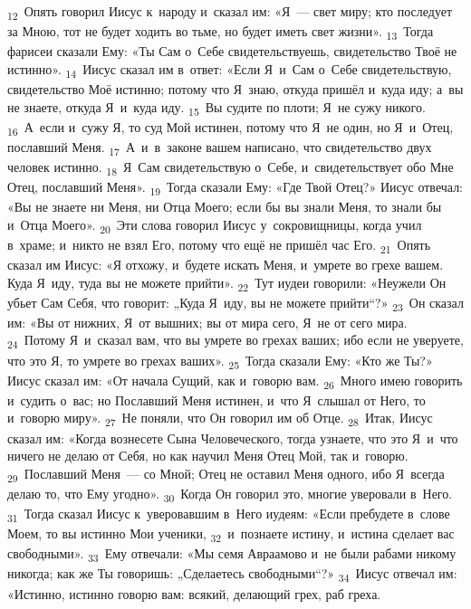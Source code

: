 \documentclass[a4paper,12pt]{article}
\begin{document}
\textsubscript{12}~Опять говорил Иисус к~народу и~сказал им: «Я~--- свет миру; кто последует за Мною, тот не будет ходить во тьме, но будет иметь свет жизни».
\textsubscript{13}~Тогда фарисеи сказали Ему: «Ты Сам о~Себе свидетельствуешь, свидетельство Твоё не истинно».
\textsubscript{14}~Иисус сказал им в~ответ: «Если Я~и~Сам о~Себе свидетельствую, свидетельство Моё истинно; потому что Я~знаю, откуда пришёл и~куда иду; а~вы не знаете, откуда Я~и~куда иду.
\textsubscript{15}~Вы судите по плоти; Я~не сужу никого.
\textsubscript{16}~А~если и~сужу Я, то суд Мой истинен, потому что Я~не один, но Я~и~Отец, пославший Меня.
\textsubscript{17}~А~и~в~законе вашем написано, что свидетельство двух человек истинно.
\textsubscript{18}~Я~Сам свидетельствую о~Себе, и~свидетельствует обо Мне Отец, пославший Меня».
\textsubscript{19}~Тогда сказали Ему: «Где Твой Отец?» Иисус отвечал: «Вы не знаете ни Меня, ни Отца Моего; если бы вы знали Меня, то знали бы и~Отца Моего».
\textsubscript{20}~Эти слова говорил Иисус у~сокровищницы, когда учил в~храме; и~никто не взял Его, потому что ещё не пришёл час Его.
\textsubscript{21}~Опять сказал им Иисус: «Я отхожу, и~будете искать Меня, и~умрете во грехе вашем. Куда Я~иду, туда вы не можете прийти».
\textsubscript{22}~Тут иудеи говорили: «Неужели Он убьет Сам Себя, что говорит: „Куда Я~иду, вы не можете прийти“?»
\textsubscript{23}~Он сказал им: «Вы от нижних, Я~от вышних; вы от мира сего, Я~не от сего мира.
\textsubscript{24}~Потому Я~и~сказал вам, что вы умрете во грехах ваших; ибо если не уверуете, что это Я, то умрете во грехах ваших».
\textsubscript{25}~Тогда сказали Ему: «Кто же Ты?» Иисус сказал им: «От начала Сущий, как и~говорю вам.
\textsubscript{26}~Много имею говорить и~судить о~вас; но Пославший Меня истинен, и~что Я~слышал от Него, то и~говорю миру».
\textsubscript{27}~Не поняли, что Он говорил им об Отце.
\textsubscript{28}~Итак, Иисус сказал им: «Когда вознесете Сына Человеческого, тогда узнаете, что это Я~и~что ничего не делаю от Себя, но как научил Меня Отец Мой, так и~говорю.
\textsubscript{29}~Пославший Меня~--- со Мной; Отец не оставил Меня одного, ибо Я~всегда делаю то, что Ему угодно».
\textsubscript{30}~Когда Он говорил это, многие уверовали в~Него.
\textsubscript{31}~Тогда сказал Иисус к~уверовавшим в~Него иудеям: «Если пребудете в~слове Моем, то вы истинно Мои ученики,
\textsubscript{32}~и~познаете истину, и~истина сделает вас свободными».
\textsubscript{33}~Ему отвечали: «Мы семя Авраамово и~не были рабами никому никогда; как же Ты говоришь: „Сделаетесь свободными“?»
\textsubscript{34}~Иисус отвечал им: «Истинно, истинно говорю вам: всякий, делающий грех, раб греха.
\end{document}
